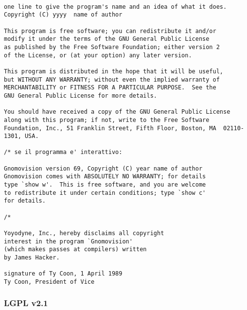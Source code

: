 \begin{lstlisting}[caption=Licenza GPLv2]

one line to give the program's name and an idea of what it does.
Copyright (C) yyyy  name of author

This program is free software; you can redistribute it and/or
modify it under the terms of the GNU General Public License
as published by the Free Software Foundation; either version 2
of the License, or (at your option) any later version.

This program is distributed in the hope that it will be useful,
but WITHOUT ANY WARRANTY; without even the implied warranty of
MERCHANTABILITY or FITNESS FOR A PARTICULAR PURPOSE.  See the
GNU General Public License for more details.

You should have received a copy of the GNU General Public License
along with this program; if not, write to the Free Software
Foundation, Inc., 51 Franklin Street, Fifth Floor, Boston, MA  02110-1301, USA.

/* se il programma e' interattivo:

Gnomovision version 69, Copyright (C) year name of author
Gnomovision comes with ABSOLUTELY NO WARRANTY; for details
type `show w'.  This is free software, and you are welcome
to redistribute it under certain conditions; type `show c' 
for details.

/*

Yoyodyne, Inc., hereby disclaims all copyright
interest in the program `Gnomovision'
(which makes passes at compilers) written 
by James Hacker.

signature of Ty Coon, 1 April 1989
Ty Coon, President of Vice

\end{lstlisting}

\subsubsection{LGPL v2.1}








